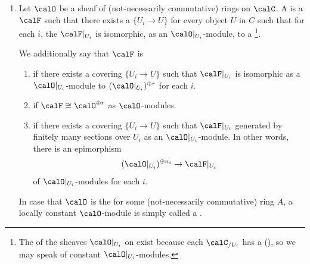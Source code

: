\begin{definition}
\begin{enumerate}
    \item Let $\calO$ be a sheaf of (not-necessarily commutative) rings on $\calC$. 
    A  is a  $\calF$ such that there exists a  $\{U_i \to U\}$ for every object $U$ in $C$ such that for each $i$, the  $\calF|_{U_i}$ is isomorphic, as an $\calO|_{U_i}$-module, to a \footnote{The  of the sheaves $\calO|_{U_i}$ on  exist because each $\calC_{/U_i}$ has a (), so we may speak of constant $\calO|_{U_i}$-modules.}.

    We additionally say that $\calF$ is 
    \begin{enumerate}
        \item {} if there exists a covering $\{U_i \to U\}$ such that $\calF|_{U_i}$ is isomorphic as a $\calO|_{U_i}$-module to $(\calO|_{U_i})^{\oplus r}$ for each $i$.

        \item {} if $\calF \cong \calO^{\oplus r}$ as $\calO$-modules.

        \item {} if there exists a covering $\{U_i \to U\}$ such that $\calF|_{U_i}$ generated by finitely many sections over $U_i$ as an $\calO|_{U_i}$-module. In other words, there is an epimorphism 
        $$(\calO|_{U_i})^{\oplus n_i} \to \calF|_{U_i}$$
        of $\calO|_{U_i}$-modules for each $i$.
    \end{enumerate}

    In case that $\calO$ is the  for some (not-necessarily commutative) ring $A$, a locally constant $\calO$-module is simply called a .


\end{enumerate}
\end{definition}

